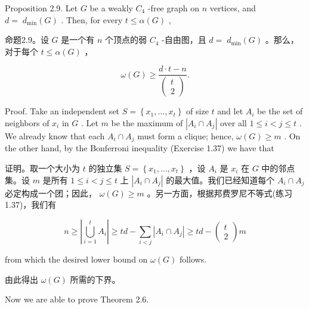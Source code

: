 \documentclass[10pt]{article}
\begin{document}
Proposition 2.9. Let \(G\) be a weakly \({C}_{4}\) -free graph on \(n\) vertices, and \(d = \; {d}_{\min }\left( G\right)\) . Then, for every \(t \leq  \alpha \left( G\right)\) ,

\begin{tcolorbox}\relax
命题2.9。设 \(G\) 是一个有 \(n\) 个顶点的弱 \({C}_{4}\) -自由图，且 \(d = \; {d}_{\min }\left( G\right)\) 。那么，对于每个 \(t \leq  \alpha \left( G\right)\) ，
\end{tcolorbox}

\[
\omega \left( G\right)  \geq  \frac{d \cdot  t - n}{\left( \begin{array}{l} t \\  2 \end{array}\right) }.
\]

Proof. Take an independent set \(S = \left\{  {{x}_{1},\ldots ,{x}_{t}}\right\}\) of size \(t\) and let \({A}_{i}\) be the set of neighbors of \({x}_{i}\) in \(G\) . Let \(m\) be the maximum of \(\left| {{A}_{i} \cap  {A}_{j}}\right|\) over all \(1 \leq  i < j \leq  t\) . We already know that each \({A}_{i} \cap  {A}_{j}\) must form a clique; hence, \(\omega \left( G\right)  \geq  m\) . On the other hand, by the Bonferroni inequality (Exercise 1.37) we have that

\begin{tcolorbox}\relax
证明。取一个大小为 \(t\) 的独立集 \(S = \left\{  {{x}_{1},\ldots ,{x}_{t}}\right\}\) ，设 \({A}_{i}\) 是 \({x}_{i}\) 在 \(G\) 中的邻点集。设 \(m\) 是所有 \(1 \leq  i < j \leq  t\) 上 \(\left| {{A}_{i} \cap  {A}_{j}}\right|\) 的最大值。我们已经知道每个 \({A}_{i} \cap  {A}_{j}\) 必定构成一个团；因此， \(\omega \left( G\right)  \geq  m\) 。另一方面，根据邦费罗尼不等式(练习1.37)，我们有
\end{tcolorbox}

\[
n \geq  \left| {\mathop{\bigcup }\limits_{{i = 1}}^{t}{A}_{i}}\right|  \geq  {td} - \mathop{\sum }\limits_{{i < j}}\left| {{A}_{i} \cap  {A}_{j}}\right|  \geq  {td} - \left( \begin{array}{l} t \\  2 \end{array}\right) m
\]

from which the desired lower bound on \(\omega \left( G\right)\) follows.

\begin{tcolorbox}\relax
由此得出 \(\omega \left( G\right)\) 所需的下界。
\end{tcolorbox}

Now we are able to prove Theorem 2.6.
\end{document}
